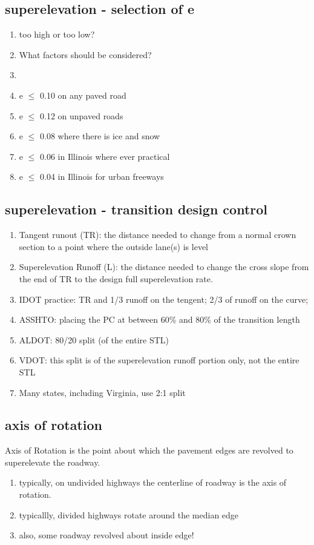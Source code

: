 \documentclass{article}
\begin{document}
  \subsection{superelevation - selection of e}
  \begin{enumerate}
    \item too high or too low?
    \item What factors should be considered?
    \item 
    \item e $\leq$ 0.10 on any paved road
    \item e $\leq$ 0.12 on unpaved roads
    \item e $\leq$ 0.08 where there is ice and snow
    \item e $\leq$ 0.06 in Illinois where ever practical
    \item e $\leq$ 0.04 in Illinois for urban freeways
  \end{enumerate}





  \subsection{superelevation - transition design control}
  \begin{enumerate}
    \item Tangent runout (TR): the distance needed to change from a normal crown section to a point where the outside lane(s) is level
    \item Superelevation Runoff (L): the distance needed to change the cross slope from the end of TR to the design full superelevation rate. 
    \item IDOT practice: TR and 1/3 runoff on the tengent; 2/3 of runoff on the curve;
    \item ASSHTO: placing the PC at between 60\% and 80\% of the transition length
    \item ALDOT: 80/20 split (of the entire STL) 
    \item VDOT: this split is of the superelevation runoff portion only, not the entire STL
    \item Many states, including Virginia, use 2:1 split
  \end{enumerate}

  \subsection{axis of rotation}
  Axis of Rotation is the point about which the pavement edges are revolved to superelevate the roadway. 
  \begin{enumerate}
    \item typically, on undivided highways the centerline of roadway is the axis of rotation.  
    \item typicallly, divided highways rotate around the median edge
    \item also, some roadway revolved about inside edge!
  \end{enumerate}
\end{document}
